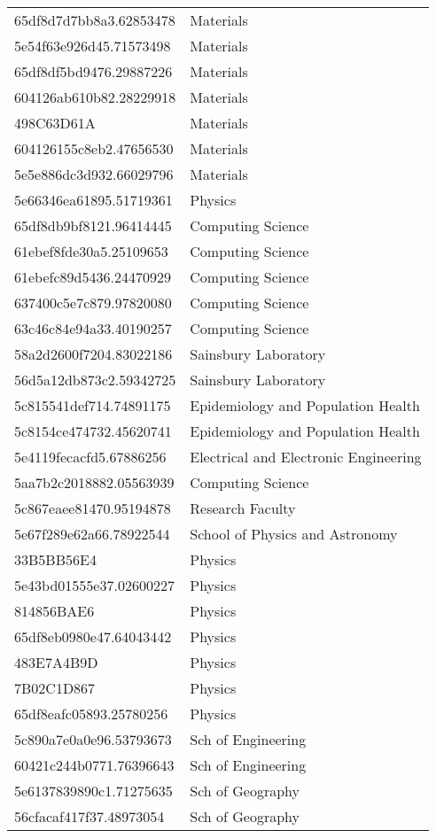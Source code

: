 \begin{tabular}{ll}
65df8d7d7bb8a3.62853478 & Materials \\
5e54f63e926d45.71573498 & Materials \\
65df8df5bd9476.29887226 & Materials \\
604126ab610b82.28229918 & Materials \\
498C63D61A & Materials \\
604126155c8eb2.47656530 & Materials \\
5e5e886dc3d932.66029796 & Materials \\
5e66346ea61895.51719361 & Physics \\
65df8db9bf8121.96414445 & Computing Science \\
61ebef8fde30a5.25109653 & Computing Science \\
61ebefc89d5436.24470929 & Computing Science \\
637400c5e7c879.97820080 & Computing Science \\
63c46c84e94a33.40190257 & Computing Science \\
58a2d2600f7204.83022186 & Sainsbury Laboratory \\
56d5a12db873c2.59342725 & Sainsbury Laboratory \\
5c815541def714.74891175 & Epidemiology and Population Health \\
5c8154ce474732.45620741 & Epidemiology and Population Health \\
5e4119fecacfd5.67886256 & Electrical and Electronic Engineering \\
5aa7b2c2018882.05563939 & Computing Science \\
5c867eaee81470.95194878 & Research Faculty \\
5e67f289e62a66.78922544 & School of Physics and Astronomy \\
33B5BB56E4 & Physics \\
5e43bd01555e37.02600227 & Physics \\
814856BAE6 & Physics \\
65df8eb0980e47.64043442 & Physics \\
483E7A4B9D & Physics \\
7B02C1D867 & Physics \\
65df8eafc05893.25780256 & Physics \\
5c890a7e0a0e96.53793673 & Sch of Engineering \\
60421c244b0771.76396643 & Sch of Engineering \\
5e6137839890c1.71275635 & Sch of Geography \\
56cfacaf417f37.48973054 & Sch of Geography \\

\end{tabular}
